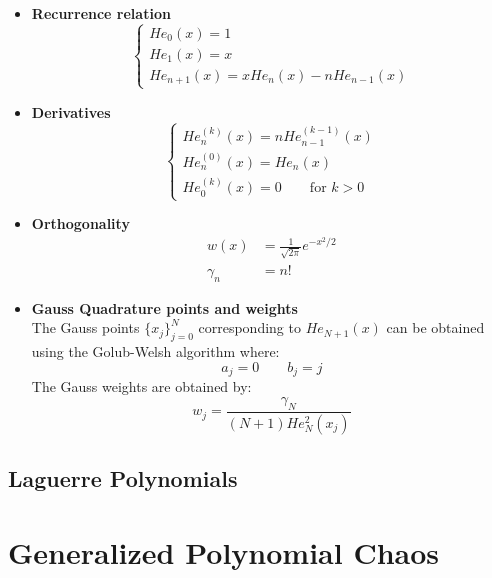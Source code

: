 \documentclass[a4paper,10pt]{article}
\begin{document}
\begin{itemize}
	\item \textbf{Recurrence relation}
		\begin{equation}
			\begin{cases}
			He_0(x) = 1 \\
			He_1(x) = x \\
			He_{n+1}(x) = xHe_n(x) - nHe_{n-1}(x)
			\end{cases}
		\end{equation}
	\item \textbf{Derivatives} 
		\begin{equation}
			\begin{cases}
			He_n^{(k)}(x) = nHe_{n-1}^{(k-1)}(x) \\
			He_n^{(0)}(x) = He_n(x) \\
			He_0^{(k)}(x) = 0 \qquad \text{for $k>0$}
			\end{cases}
		\end{equation}
	\item \textbf{Orthogonality} 
		\begin{align}
			w(x) &= \frac{1}{\sqrt{2\pi}} e^{-x^2/2} \\
			\gamma_n &= n!
		\end{align}
	\item \textbf{Gauss Quadrature points and weights}\\
		The Gauss points $\lbrace x_j \rbrace_{j=0}^N$ corresponding to $He_{N+1}(x)$ can be obtained using the Golub-Welsh algorithm \cite{press_numerical_2007} where:
		\begin{equation}
			a_j = 0 \qquad b_j = j
		\end{equation}
		The Gauss weights are obtained by:
		\begin{equation}
			w_j = \frac{\gamma_N}{(N+1)He_N^2(x_j)}
		\end{equation}
\end{itemize}

\subsection{Laguerre Polynomials}

\section{Generalized Polynomial Chaos}
\end{document}

